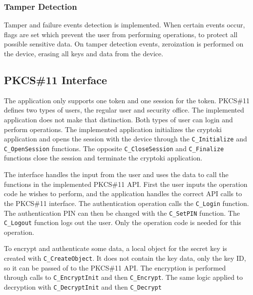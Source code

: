 \subsubsection*{Tamper Detection}

Tamper and failure events detection is implemented. When certain events occur, flags are set which prevent the user from performing operations, to protect all possible sensitive data. On tamper detection events, zeroization is performed on the device, erasing all keys and data from the device.


\subsection{PKCS\#11 Interface}\label{chap:implementation:app:interface}

The application only supports one token and one session for the token.
PKCS\#11 defines two types of users, the regular user and security office. The implemented application does not make that distinction. Both types of user can login and perform operations.
The implemented application initializes the cryptoki application and opens the session with the device through the \texttt{C\_Initialize} and \texttt{C\_OpenSession} functions.
The opposite \texttt{C\_CloseSession} and \texttt{C\_Finalize} functions close the session and terminate the cryptoki application.

The interface handles the input from the user and uses the data to call the functions in the implemented PKCS\#11 API.
First the user inputs the operation code he wishes to perform, and the application handles the correct API calls to the PKCS\#11 interface.
The authentication operation calls the \texttt{C\_Login} function. The authentication PIN can then be changed with the \texttt{C\_SetPIN} function.
The \texttt{C\_Logout} function logs out the user. Only the operation code is needed for this operation.

To encrypt and authenticate some data, a local object for the secret key is created with \texttt{C\_CreateObject}. It does not contain the key data, only the key ID, so it can be passed of to the PKCS\#11 API. The encryption is performed through calls to \texttt{C\_EncryptInit} and then \texttt{C\_Encrypt}.
The same logic applied to decryption with \texttt{C\_DecryptInit} and then \texttt{C\_Decrypt}

